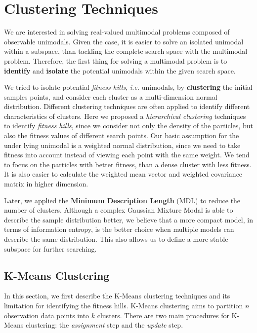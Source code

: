 \chapter{Clustering Techniques}
\label{chapter:clustering}

We are interested in solving real-valued multimodal problems composed of observable unimodals.
Given the case, it is easier to solve an isolated unimodal within a subspace,
than tackling the complete search space with the multimodal problem.
Therefore, the first thing for solving a multimodal problem is to \textbf{identify} and \textbf{isolate}
the potential unimodals within the given search space.

We tried to isolate potential \textit{fitness hills}, \textit{i.e.} unimodals,
by \textbf{clustering} the initial samples points,
and consider each cluster as a multi-dimension normal distribution.
Different clustering techniques are often applied to identify different characteristics of clusters.
Here we proposed a \textit{hierarchical clustering} techniques to identify \textit{fitness hills},
since we consider not only the density of the particles,
but also the fitness values of different search points.
Our basic assumption for the under lying unimodal is a weighted normal distribution, 
since we need to take fitness into account instead of viewing each point with the same weight.
We tend to focus on the particles with better fitness,
than a dense cluster with less fitness. 
It is also easier to calculate the weighted mean vector and weighted covariance matrix in higher dimension. 

Later, we applied the \textbf{Minimum Description Length} (MDL) to reduce the number of clusters.
Although a complex Gaussian Mixture Modal is able to describe the sample distribution better,
we believe that a more compact model, in terms of information entropy, is the better choice 
when multiple models can describe the same distribution. 
This also allows us to define a more stable subspace for further searching.


\section{K-Means Clustering}
In this section, we first describe the K-Means clustering techniques and its limitation for identifying the fitness hills.
K-Means clustering aims to partition $n$ observation data points into $k$ clusters.
There are two main procedures for K-Means clustering: the \textit{assignment} step and the \textit{update} step.

